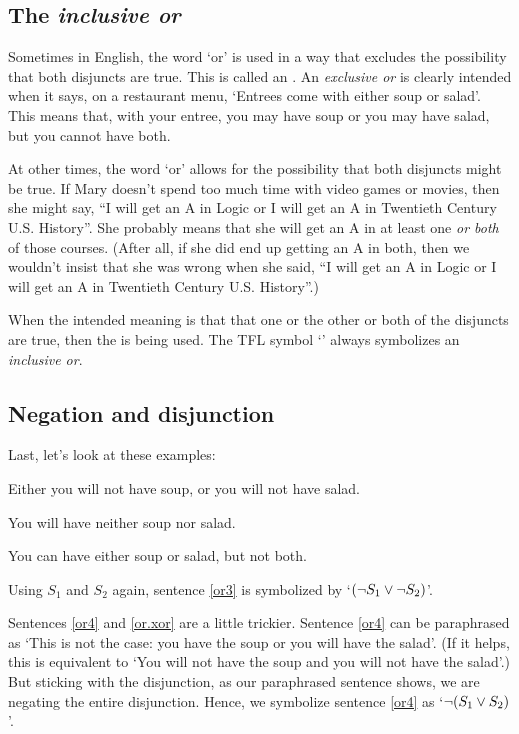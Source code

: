 \subsection{The \textit{inclusive or}}

Sometimes in English, the word `or' is used in a way that excludes the possibility that both disjuncts are true. This is called an .  An \emph{exclusive or} is clearly intended when it says, on a restaurant menu, `Entrees come with either soup or salad'. This means that, with your entree, you may have soup or you may have salad, but you cannot have both.

At other times, the word `or' allows for the possibility that both disjuncts might be true. If Mary doesn't spend too much time with video games or movies, then she might say, ``I will get an A in Logic or I will get an A in Twentieth Century U.S. History''. She probably means that she will get an A in at least one \textit{or both} of those courses. (After all, if she did end up getting an A in both, then we wouldn't insist that she was wrong when she said, ``I will get an A in Logic or I will get an A in Twentieth Century U.S. History''.)

When the intended meaning is that that one or the other or both of the disjuncts are true, then the  is being used. The TFL symbol `\eor' always symbolizes an \emph{inclusive or}.

\subsection{Negation and disjunction}

Last, let's look at these examples:
	\begin{earg}
		\item[\ex{or3}] Either you will not have soup, or you will not have salad.
		\item[\ex{or4}] You will have neither soup nor salad.
		\item[\ex{or.xor}] You can have either soup or salad, but not both.
	\end{earg}
Using $S_1$ and $S_2$ again, sentence \ref{or3} is symbolized by `$({\neg} S_1 \vee {\neg} S_2)$'.

Sentences \ref{or4} and \ref{or.xor} are a little trickier. Sentence \ref{or4} can be paraphrased as `This is not the case: you have the soup or you will have the salad'. (If it helps, this is equivalent to `You will not have the soup and you will not have the salad'.) But sticking with the disjunction, as our paraphrased sentence shows, we are negating the entire disjunction. Hence, we symbolize sentence \ref{or4} as `${\neg} (S_1 \vee S_2)$'. 

